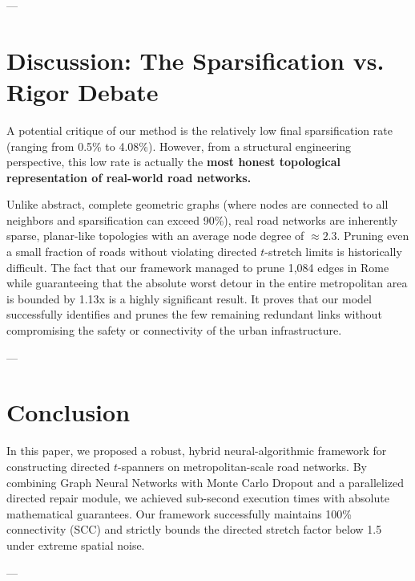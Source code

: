 \documentclass[journal]{IEEEtran}
\begin{document}
---

\section{Discussion: The Sparsification vs. Rigor Debate}
A potential critique of our method is the relatively low final sparsification rate (ranging from 0.5\% to 4.08\%). However, from a structural engineering perspective, this low rate is actually the \textbf{most honest topological representation of real-world road networks.} 

Unlike abstract, complete geometric graphs (where nodes are connected to all neighbors and sparsification can exceed 90\%), real road networks are inherently sparse, planar-like topologies with an average node degree of $\approx 2.3$. Pruning even a small fraction of roads without violating directed $t$-stretch limits is historically difficult. The fact that our framework managed to prune 1,084 edges in Rome while guaranteeing that the absolute worst detour in the entire metropolitan area is bounded by 1.13x is a highly significant result. It proves that our model successfully identifies and prunes the few remaining redundant links without compromising the safety or connectivity of the urban infrastructure.

---

\section{Conclusion}
In this paper, we proposed a robust, hybrid neural-algorithmic framework for constructing directed $t$-spanners on metropolitan-scale road networks. By combining Graph Neural Networks with Monte Carlo Dropout and a parallelized directed repair module, we achieved sub-second execution times with absolute mathematical guarantees. Our framework successfully maintains 100\% connectivity (SCC) and strictly bounds the directed stretch factor below 1.5 under extreme spatial noise.

---
\end{document}
